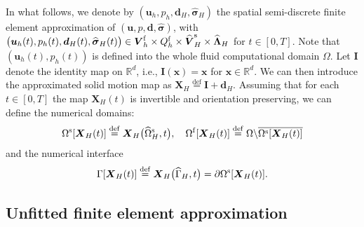 \documentclass[11pt,reqno]{amsart}
\theoremstyle{definition}
\theoremstyle{plain}
\numberwithin{theorem}{section}
\numberwithin{proposition}{section}
\numberwithin{lemma}{section}
\numberwithin{equation}{section}
\newcommand{\bs}[1]{\boldsymbol{#1}}
\newcommand{\uu}[1]  {{\bs{#1}} }
\newcommand{\dep}{{{\bs{d}}}}
\newcommand{\bu}{\uu{u}}
\def\R{{\mathbb{R}}}
\renewcommand{\(}{\bigl(}
\renewcommand{\)}{\bigr)}
\def\eqd{\stackrel{\mathrm{def}}{=}}
\begin{document}
In what follows, %
we denote by $(\bu_h,p_h, \dep_H, \widehat{\bs \sigma} _H)$ the  
spatial semi-discrete 
finite element approximation of 
$(\bu,p, {\bs d}, \widehat{\bs \sigma} )$, with  
$\big(\bu_h(t),p_h(t), {\bs d}_H(t), \widehat{\bs\sigma} _H(t)\big)\in {\bs V}_h^{\rm f} \times  Q_h^{\rm f} \times \widehat{\bs V}_H^{\rm s} \times \widehat{\bs \Lambda}_H$
for $t \in [0,T]$.
Note that $(\bu_h(t),p_h(t))$ 
is  defined into the whole fluid computational  domain $\Omega$.
Let ${\bs I}$ denote the identity map on $\R^d$, i.e., ${\bs I}(\bs x)= \bs x$ for $\bs x\in\R^d$.
We can then introduce the approximated solid motion map as $\bs X_H \eqd  {\bs I} + {\bs d}_H $. Assuming that for each $t\in [0,T]$ the map $\bs X_H(t)$ is invertible and orientation preserving, we can define the numerical domains: 
\begin{align}
\Omega^{\rm s}[\bs X_H(t)] 
\eqd  \bs X_H\big(\widehat{\Omega}^{\rm s}_H,t\big) ,\quad 
\Omega^{\rm f}[\bs X_H(t)] 
\eqd \Omega \backslash \overline{\Omega^{\rm s}[\bs X_H(t)]}
\end{align}
and the numerical interface 
\begin{align}
\Gamma[\bs X_H(t)] \eqd  \bs X_H\big(\widehat \Gamma_H,t\big) =   \partial \Omega^{\rm s}[\bs X_H(t)] . 
\end{align}


\subsection{Unfitted finite element approximation}\label{section:FEM}
\end{document}
